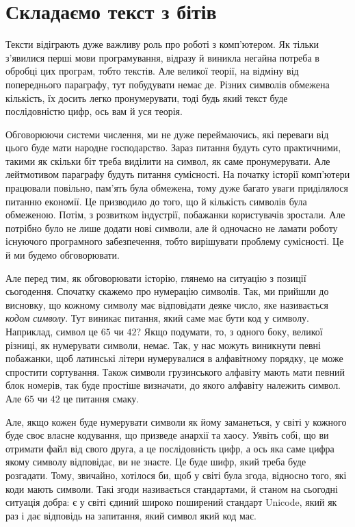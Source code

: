 \section{Складаємо текст з бітів}

Тексти відіграють дуже важливу роль про роботі з комп'ютером.
Як тільки з'явилися перші мови програмування, відразу й виникла негайна потреба в обробці цих програм, тобто текстів.
Але великої теорії, на відміну від попереднього параграфу, тут побудувати немає де.
Різних символів обмежена кількість, їх досить легко пронумерувати, тоді будь який текст буде послідовністю цифр, ось вам й уся теорія.

Обговорюючи системи числення, ми не дуже переймаючись, які переваги від цього буде мати народне господарство.
Зараз питання будуть суто практичними, такими як скільки біт треба виділити на символ, як саме пронумерувати.
Але лейтмотивом параграфу будуть питання сумісності.
На початку історії комп'ютери працювали повільно, пам'ять була обмежена, тому дуже багато уваги приділялося питанню економії.
Це призводило до того, що й кількість символів була обмеженою.
Потім, з розвитком індустрії, побажанки користувачів зростали.
Але потрібно було не лише додати нові символи, але й одночасно не ламати роботу існуючого програмного забезпечення, тобто вирішувати проблему сумісності.
Це й ми будемо обговорювати.

Але перед тим, як обговорювати історію, глянемо на ситуацію з позиції сьогодення.
Спочатку скажемо про нумерацію символів.
Так, ми прийшли до висновку, що кожному символу має відповідати деяке число, яке називається \textit{кодом символу}.
Тут виникає питання, який саме має бути код у символу.
Наприклад, символ  це $65$ чи $42$?
Якщо подумати, то, з одного боку, великої різниці, як нумерувати символи, немає.
Так, у нас можуть виникнути певні побажанки, щоб латинські літери нумерувалися в алфавітному порядку, це може спростити сортування.
Також символи грузинського алфавіту мають мати певний блок номерів, так буде простіше визначати, до якого алфавіту належить символ.
Але $65$ чи $42$ це питання смаку.

Але, якщо кожен буде нумерувати символи як йому заманеться, у світі у кожного буде своє власне кодування, що призведе анархії та хаосу.
Уявіть собі, що ви отримати файл від свого друга, а це послідовність цифр, а ось яка саме цифра якому символу відповідає, ви не знаєте.
Це буде шифр, який треба буде розгадати.
Тому, звичайно, хотілося би, щоб у світі була згода, відносно того, які коди мають символи.
Такі згоди називається стандартами, й станом на сьогодні ситуація добра: є у світі єдиний широко поширений стандарт Unicode, який як раз і дає відповідь на запитання, який символ який код має.

